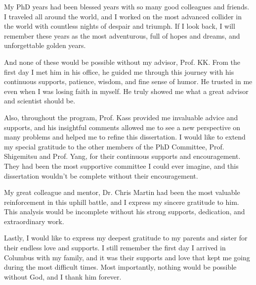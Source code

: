 \begin{acknowledgements}

My PhD years had been blessed years with so many good colleagues and friends. I traveled all around the world, and I worked on the most advanced collider in the world with countless nights of despair and triumph. If I look back, I will remember these years as the most adventurous, full of hopes and dreams, and unforgettable golden years.

And none of these would be possible without my advisor, Prof. KK. From the first day I met him in his office, he guided me through this journey with his continuous supports, patience, wisdom, and fine sense of humor. He trusted in me even when I was losing faith in myself. He truly showed me what a great advisor and scientist should be.

Also, throughout the program, Prof. Kass provided me invaluable advice and supports, and his insightful comments allowed me to see a new perspective on many problems and helped me to refine this dissertation. I would like to extend my special gratitude to the other members of the PhD Committee, Prof. Shigemitsu and Prof. Yang, for their continuous supports and encouragement. They had been the most supportive committee I could ever imagine, and this dissertation wouldn't be complete without their encouragement.

My great colleague and mentor, Dr. Chris Martin had been the most valuable reinforcement in this uphill battle, and I express my sincere gratitude to him. This analysis would be incomplete without his strong supports, dedication, and extraordinary work.

Lastly, I would like to express my deepest gratitude to my parents and sister for their endless love and supports. I still remember the first day I arrived in Columbus with my family, and it was their supports and love that kept me going during the most difficult times. Most importantly, nothing would be possible without God, and I thank him forever.


\end{acknowledgements}

